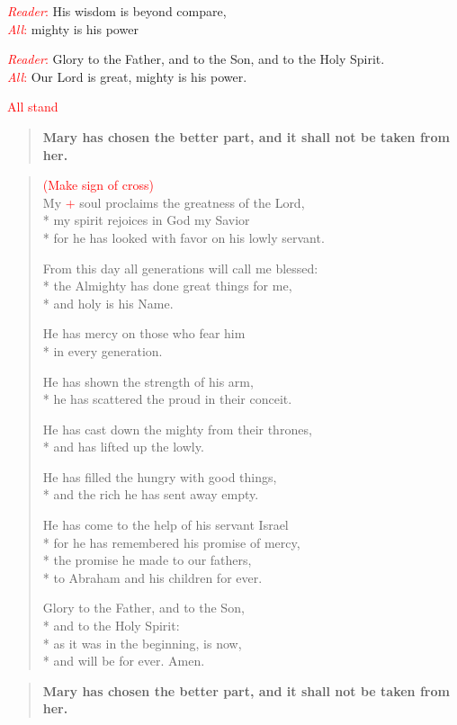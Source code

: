\documentclass[letterpaper,14pt]{extarticle}
\newcommand{\side}[1]{\flagverse{\textcolor{red}{\textit{#1}}:}}
\newcommand{\sidestar}[1]{\textcolor{red}{\textit{#1}:}}
\newcommand{\rednote}[1]{\textcolor{red}{#1}}
\newlength{\oldindent}
\newcommand{\antiphon}[2]{
	\setlength{\oldindent}{\vindent}
	\setlength{\vindent}{0em}
	\begin{verse}
	\side{#1} \textbf{#2}
	\end{verse}
	\setlength{\vindent}{\oldindent}
}
\begin{document}
\sidestar{Reader} His wisdom is beyond compare, \\
\sidestar{All} mighty is his power

\sidestar{Reader} Glory to the Father, and to the Son, and to the Holy Spirit. \\
\sidestar{All} Our Lord is great, mighty is his power.

\rednote{All stand}
\antiphon{Leader}{Mary has chosen the better part, and it shall not be taken from her.}
\setlength{\stanzaskip}{0.25\baselineskip}
\begin{verse}
\rednote{(Make sign of cross)}\\
\side{All} My \rednote{+} soul proclaims the greatness of the Lord, \\*
my spirit rejoices in God my Savior \\*
for he has looked with favor on his lowly servant.

From this day all generations will call me blessed: \\*
the Almighty has done great things for me, \\*
and holy is his Name.

He has mercy on those who fear him \\*
in every generation.

He has shown the strength of his arm, \\*
he has scattered the proud in their conceit.

He has cast down the mighty from their thrones, \\*
and has lifted up the lowly.

He has filled the hungry with good things, \\*
and the rich he has sent away empty.

He has come to the help of his servant Israel \\*
for he has remembered his promise of mercy, \\*
the promise he made to our fathers, \\*
to Abraham and his children for ever.

Glory to the Father, and to the Son, \\*
and to the Holy Spirit: \\*
as it was in the beginning, is now, \\*
and will be for ever. Amen.
\end{verse}
\setlength{\stanzaskip}{0.75\baselineskip}
\antiphon{All}{Mary has chosen the better part, and it shall not be taken from her.}
\end{document}
